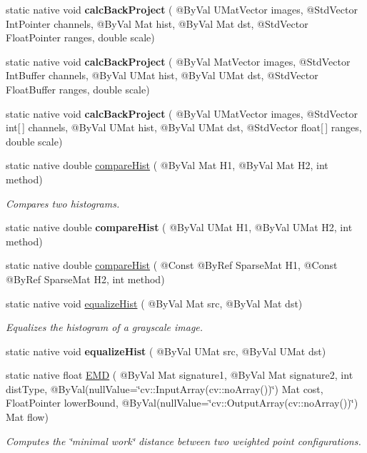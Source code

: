 \begin{DoxyCompactItemize}
\item 
static native void {\bfseries calc\+Back\+Project} ( @By\+Val U\+Mat\+Vector images, @Std\+Vector Int\+Pointer channels, @By\+Val Mat hist, @By\+Val Mat dst, @Std\+Vector Float\+Pointer ranges, double scale)
\item 
static native void {\bfseries calc\+Back\+Project} ( @By\+Val Mat\+Vector images, @Std\+Vector Int\+Buffer channels, @By\+Val U\+Mat hist, @By\+Val U\+Mat dst, @Std\+Vector Float\+Buffer ranges, double scale)
\item 
static native void {\bfseries calc\+Back\+Project} ( @By\+Val U\+Mat\+Vector images, @Std\+Vector int\mbox{[}$\,$\mbox{]} channels, @By\+Val U\+Mat hist, @By\+Val U\+Mat dst, @Std\+Vector float\mbox{[}$\,$\mbox{]} ranges, double scale)
\item 
static native double \hyperlink{group__imgproc__hist_ga2c5a33af2393e75272a7346241822627}{compare\+Hist} ( @By\+Val Mat H1, @By\+Val Mat H2, int method)
\begin{DoxyCompactList}\small\item\em Compares two histograms. \end{DoxyCompactList}\item 
static native double {\bfseries compare\+Hist} ( @By\+Val U\+Mat H1, @By\+Val U\+Mat H2, int method)
\item 
static native double \hyperlink{group__imgproc__hist_gadc2285df53903ac40eb1f3ac72136eb1}{compare\+Hist} ( @Const @By\+Ref Sparse\+Mat H1, @Const @By\+Ref Sparse\+Mat H2, int method)
\item 
static native void \hyperlink{group__imgproc__hist_gabfd0825b3947af498b1eecc64de2787c}{equalize\+Hist} ( @By\+Val Mat src, @By\+Val Mat dst)
\begin{DoxyCompactList}\small\item\em Equalizes the histogram of a grayscale image. \end{DoxyCompactList}\item 
static native void {\bfseries equalize\+Hist} ( @By\+Val U\+Mat src, @By\+Val U\+Mat dst)
\item 
static native float \hyperlink{group__imgproc__hist_ga754ea5294cd28cb142b11116e1c4d658}{E\+MD} ( @By\+Val Mat signature1, @By\+Val Mat signature2, int dist\+Type, @By\+Val(null\+Value=\char`\"{}cv\+::\+Input\+Array(cv\+::no\+Array())\char`\"{}) Mat cost, Float\+Pointer lower\+Bound, @By\+Val(null\+Value=\char`\"{}cv\+::\+Output\+Array(cv\+::no\+Array())\char`\"{}) Mat flow)
\begin{DoxyCompactList}\small\item\em Computes the \char`\"{}minimal work\char`\"{} distance between two weighted point configurations. \end{DoxyCompactList}\item 

\end{DoxyCompactItemize}
